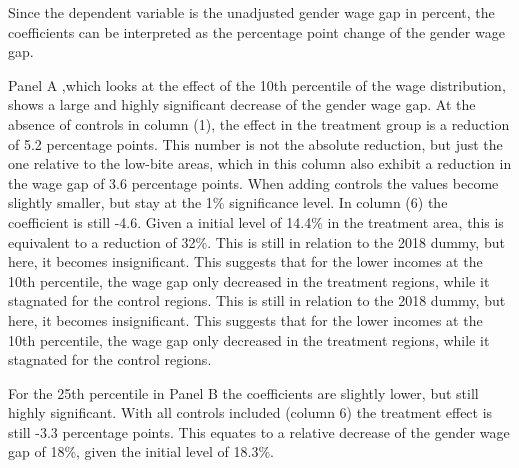 \documentclass[12pt,draft,a4paper]{article}
\begin{document}
Since the dependent variable is the unadjusted gender wage gap in percent, the coefficients can be interpreted as  the percentage point change of the gender wage gap.

Panel A ,which looks at the effect of the 10th percentile of the wage distribution, shows a large and highly significant decrease of the gender wage gap. 
At the absence of controls in column (1), the effect in the treatment group is a reduction of 5.2 percentage points. This number is not the absolute reduction, but just the one relative to the low-bite areas, which in this column also exhibit a reduction in the wage gap of 3.6 percentage points.
When adding controls the values become slightly smaller, but stay at the 1\% significance level. In column (6) the coefficient is still -4.6. Given a initial level of 14.4\% in the treatment area, this is equivalent to a reduction of 32\%.
This is still in relation to the 2018 dummy, but here, it becomes insignificant. This suggests that for the lower incomes at the 10th percentile, the wage gap only decreased in the treatment regions, while it stagnated for the control regions.
This is still in relation to the 2018 dummy, but here, it becomes insignificant. This suggests that for the lower incomes at the 10th percentile, 
the wage gap only decreased in the treatment regions, while it stagnated for the control regions.

For the 25th percentile in Panel B the coefficients are slightly lower, but still highly significant.
With all controls included (column 6) the treatment effect is still -3.3 percentage points.
This equates to a relative decrease of the gender wage gap of 18\%, given the initial level of 18.3\%.
\end{document}
